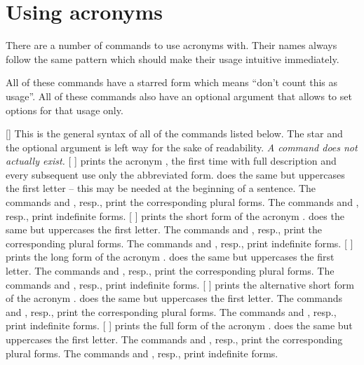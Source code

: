 \documentclass{acro-manual}
\begin{document}
\section{Using acronyms}\label{sec:using-acronyms}
There are a number of commands to use acronyms with. Their names always follow
the same pattern which should make their usage intuitive immediately.

All of these commands have a starred form which means \enquote{don't count
  this as usage}. All of these commands also have an optional argument that
allows to set options for that usage only.
\begin{commands}
  [\sarg{}]
    This is the general syntax of all of the commands listed below.  The star
    and the optional argument is left way for the sake of readability.
    \emph{A command  does not actually exist.}
  [\quad{}\quad{}\quad
    \quad{}\quad{}]
     prints the acronym , the first time with full description
    and every subsequent use only the abbreviated form.  does the same
    but uppercases the first letter -- this may be needed at the beginning of
    a sentence.  The commands  and , resp., print the
    corresponding plural forms.  The commands  and , resp.,
    print indefinite forms.
  [\quad{}\quad{}\quad
    \quad{}\quad{}]
     prints the short form of the acronym .  does the
    same but uppercases the first letter. The commands  and
    , resp., print the corresponding plural forms. The commands
     and , resp., print indefinite forms.
  [\quad{}\quad{}\quad
    \quad{}\quad{}]
     prints the long form of the acronym .  does the
    same but uppercases the first letter. The commands  and
    , resp., print the corresponding plural forms. The commands
     and , resp., print indefinite forms.
  [\quad{}\quad{}\quad
    \quad{}\quad{}]
     prints the alternative short form of the acronym .
     does the same but uppercases the first letter. The commands
     and , resp., print the corresponding plural forms. The
    commands  and , resp., print indefinite forms.
  [\quad{}\quad{}\quad
    \quad{}\quad{}]
     prints the full form of the acronym .  does the
    same but uppercases the first letter. The commands  and
    , resp., print the corresponding plural forms. The commands
     and , resp., print indefinite forms.
\end{commands}
\end{document}
